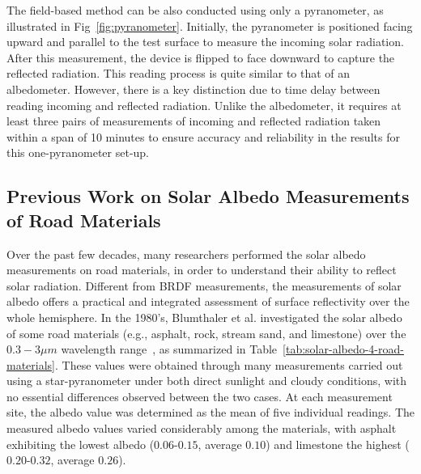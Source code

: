 The field-based method can be also conducted using only a pyranometer, as illustrated in Fig~\ref{fig:pyranometer}.
Initially, the pyranometer is positioned facing upward and parallel to the test surface to measure the incoming solar radiation.
After this measurement, the device is flipped to face downward to capture the reflected radiation.
This reading process is quite similar to that of an albedometer.
However, there is a key distinction due to time delay between reading incoming and reflected radiation.
Unlike the albedometer, it requires at least three pairs of measurements of incoming and reflected radiation taken within a span of 10 minutes to ensure accuracy and reliability in the results for this one-pyranometer set-up.


\subsection{Previous Work on Solar Albedo Measurements of Road Materials}

Over the past few decades, many researchers performed the solar albedo measurements on road materials, in order to understand their ability to reflect solar radiation.
Different from BRDF measurements, the measurements of solar albedo offers a practical and integrated assessment of surface reflectivity over the whole hemisphere.
In the 1980's, Blumthaler et al. investigated the solar albedo of some road materials (e.g., asphalt, rock, stream sand, and limestone) over the $0.3-3 \mu m$ wavelength range~\cite{1988_Blumthaler}, as summarized in Table~\ref{tab:solar-albedo-4-road-materials}.
These values were obtained through many measurements carried out using a star-pyranometer under both direct sunlight and cloudy conditions, with no essential differences observed between the two cases.
At each measurement site, the albedo value was determined as the mean of five individual readings.
The measured albedo values varied considerably among the materials, with asphalt exhibiting the lowest albedo ($0.06$-$0.15$, average $0.10$) and limestone the highest ($0.20$-$0.32$, average $0.26$).


